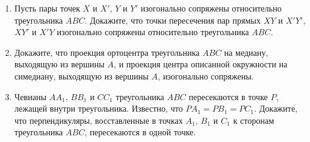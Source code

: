 \documentclass{article}
\begin{document}
\begin{enumerate}[label*=\protect\fbox{\arabic{enumi}}]
\item Пусть пары точек \(X\) и \(X'\), \(Y\) и \(Y'\) изогонально сопряжены относительно треугольника \(ABC\). Докажите, что точки пересечения пар прямых \(XY\) и \(X'Y'\), \(XY'\) и \(X'Y\) изогонально сопряжены относительно треугольника \(ABC\).

\item Докажите, что проекция ортоцентра треугольника \(ABC\) на медиану, выходящую из вершины \(A\), и проекция центра описанной окружности на симедиану, выходящую из вершины \(A\), изогонально сопряжены.

\item Чевианы \(AA_1\), \(BB_1\) и \(CC_1\) треугольника \(ABC\) пересекаются в точке \(P\), лежащей внутри треугольника. Известно, что \(PA_1 = PB_1 = PC_1\). Докажите, что перпендикуляры, восставленные в точках \(A_1\), \(B_1\) и \(C_1\) к сторонам треугольника \(ABC\), пересекаются в одной точке.

\end{enumerate}
\end{document}
